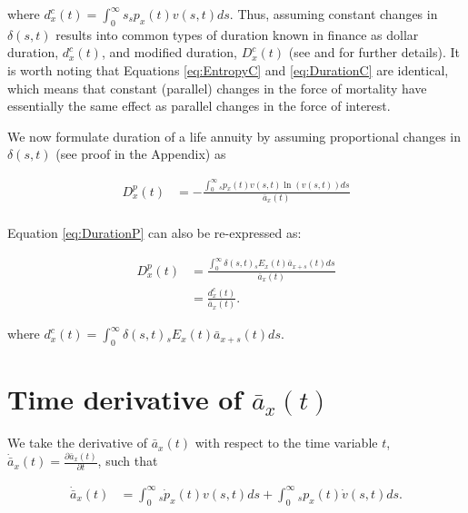 \documentclass[12pt]{article}
\begin{document}
where ${d}^{c}_x(t)=\int_0^\infty s {}_sp_x(t) {v}(s,t)ds$. Thus, assuming constant changes in $\delta(s,t)$ results into common types of duration known in finance as dollar duration, ${d}^{c}_x(t)$, and modified duration, ${D}^{c}_x(t)$ (see \citet{Milevsky2012} and \citet{Tsai2013a} for further details). It is worth noting that Equations \ref{eq:EntropyC} and \ref{eq:DurationC} are identical, which means that constant (parallel) changes in the force of mortality have essentially the same effect as parallel changes in the force of interest.




We now formulate duration of a life annuity by assuming proportional changes in $\delta(s,t)$ (see proof in the Appendix) as 


\begin{equation}\label{eq:DurationP}
\begin{split}
{D}^{p}_{x}(t) &= -\frac{\int_0^\infty {}_sp_x(t) v(s,t) \ln(v(s,t))ds}{\bar{a}_x(t)} \\
\end{split}
\end{equation}

Equation \ref{eq:DurationP} can also be re-expressed as:

\begin{equation}\label{eq:DurationP2}
\begin{split}
{D}^{p}_{x}(t) &= \frac{\int_0^\infty \delta(s,t) {}_sE_x(t) \bar{a}_{x+s}(t)ds} {\bar{a}_x(t)} \\
                 &= \frac{{d}^{c}_{x}(t)}{\bar{a}_x(t)}.
\end{split}
\end{equation}


where ${d}^{c}_{x}(t)=\int_0^\infty \delta(s,t) {}_sE_x(t) \bar{a}_{x+s}(t) ds$. 



\section{Time derivative of $\bar{a}_x(t)$}

We take the derivative of $\bar{a}_x(t)$ with respect to the time variable $t$, $\dot{\bar{a}} _x(t)=\frac{\partial \bar{a}_x(t)}{\partial t}$, such that

\begin{equation}\label{eq:TimeDeriv}
\begin{split}
\dot{\bar{a}} _x(t) &= \int_0^\infty {}_s\dot{p}_x(t) v(s,t)ds +\int_0^\infty {}_sp_x(t) \dot{v}(s,t)ds.\\
\end{split}
\end{equation}
\end{document}
